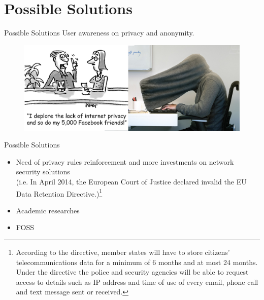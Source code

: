 
\section{Possible Solutions}
\begin{frame}{Possible Solutions}
	User awareness on privacy and anonymity.
	\begin{figure}
		\centering
		\includegraphics[scale=0.50]{imgs/user_privacy.jpg}
	\end{figure}
\end{frame}

\begin{frame}{Possible Solutions}
	\begin{itemize}
		\item Need of privacy rules reinforcement and more investments on network
security solutions\\
			\small{(i.e. In April 2014, the European Court of Justice declared
invalid the EU Data Retention Directive.)\footnote{According to the directive, 
member states will have to store citizens' telecommunications data for a minimum 
of 6 months and at most 24 months. Under the directive the police and security 
agencies will be able to request access to details such as IP address and time 
of use of every email, phone call and text message sent or received.}}
		\item Academic researches
		\item FOSS
	\end{itemize}	
\end{frame}

